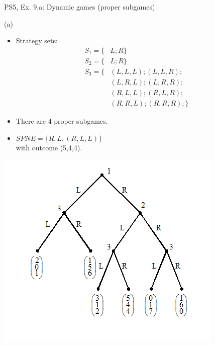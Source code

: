 \begin{frame}{PS5, Ex. 9.a: Dynamic games (proper subgames)}
  \begin{multicols}{2}
    (a)
    \begin{itemize}
      \item Strategy sets:
      \begin{align*}
        S_1=\{&L;R\}\\
        S_2=\{&L;R\}\\
        S_3=\{&(L,L,L);(L,L,R);\\
              &(L,R,L);(L,R,R);\\
              &(R,L,L);(R,L,R);\\
              &(R,R,L);(R,R,R);\}
      \end{align*}
      \item There are 4 proper subgames.
      \item $SPNE=\{R,L,(R,L,L)\}$ \\
            with outcome (5,4,4).
    \end{itemize}
    \vfill\null \columnbreak
    \includegraphics[width=1.2\columnwidth]{figures/Set_5_figure_1}
    \vfill\null
  \end{multicols}
\end{frame}

